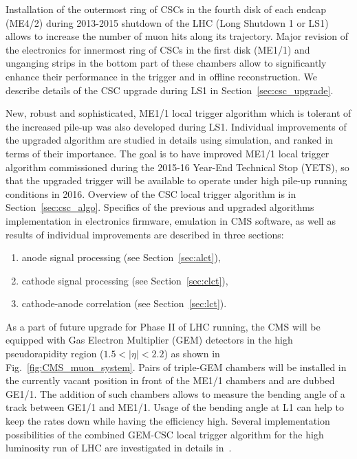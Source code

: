 Installation of the outermost ring of CSCs in the fourth disk of each endcap (ME4/2) during 2013-2015 shutdown of the LHC (Long Shutdown 1 or LS1) allows to increase the number of muon hits along its trajectory. Major revision of the electronics for innermost ring of CSCs in the first disk (ME1/1) and unganging strips in the bottom part of these chambers allow to significantly enhance their performance in the trigger and in offline reconstruction. We describe details of the CSC upgrade during LS1 in Section~\ref{sec:csc_upgrade}.

New, robust and sophisticated, ME1/1 local trigger algorithm which is tolerant of the increased pile-up was also developed during LS1. Individual improvements of the upgraded algorithm are studied in details using simulation, and ranked in terms of their importance. The goal is to have improved ME1/1 local trigger algorithm commissioned during the 2015-16 Year-End Technical Stop (YETS), so that the upgraded trigger will be available to operate under high pile-up running conditions in 2016. Overview of the CSC local trigger algorithm is in Section~\ref{sec:csc_algo}. Specifics of the previous and upgraded algorithms implementation in electronics firmware, emulation in CMS software, as well as results of individual improvements are described in three sections:
\begin{enumerate}
\item anode signal processing (see Section~\ref{sec:alct}),
\item cathode signal processing (see Section~\ref{sec:clct}),
\item cathode-anode correlation (see Section~\ref{sec:lct}).
\end{enumerate}

As a part of future upgrade for Phase II of LHC running, the CMS will be equipped with Gas Electron Multiplier (GEM) detectors in the high pseudorapidity region ($1.5 < |\eta| < 2.2$) as shown in Fig.~\ref{fig:CMS_muon_system}. Pairs of triple-GEM chambers will be installed in the currently vacant position in front of the ME1/1 chambers and are dubbed GE1/1. The addition of such chambers allows to measure the bending angle of a track between GE1/1 and ME1/1. Usage of the bending angle at L1 can help to keep the rates down while having the efficiency high. Several implementation possibilities of the combined GEM-CSC local trigger algorithm for the high luminosity run of LHC are investigated in details in~\cite{CMS_DN-14-018}.